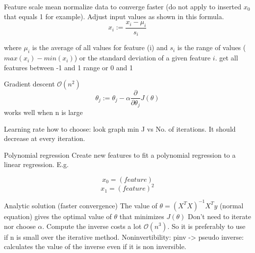 \documentclass[12pt,a4paper]{report}
\begin{document}
Feature scale
	mean normalize data to converge faster (do not apply to inserted $ x_{0} $ that equals 1 for example). Adjust input values as shown in this formula.
	\begin{equation}
	x_{i} := \frac{x_{i}-\mu_{i}}{s_{i}}
	\end{equation}
	
	where $ \mu_{i} $ is the average of all values for feature (i) and $ s_{i} $ is the range of values ($ max(x_{i})-min(x_{i}) $) or the standard deviation of a given feature $ i $.
	get all features between -1 and 1 range or 0 and 1
	
Gradient descent $\mathcal{O}(n^{2})$
	\begin{equation}
	\theta_{j} := \theta_{j} - \alpha \frac{\partial}{\partial \theta_{j}}J(\theta)
	\end{equation}
	works well when n is large
	
Learning rate
	how to choose: look graph min J vs No. of iterations. It should decrease at every iteration.

Polynomial regression
	Create new features to fit a polynomial regression to a linear regression.
	E.g.
	
	\begin{equation}
	x_{0} = (feature)
	\end{equation}
	\begin{equation}
	x_{1} = (feature)^{2}
	\end{equation}
	
	
Analytic solution (faster convergence)
	The value of $ \theta = (X^{T}X)^{-1}X^{T}y $ (normal equation) gives the optimal value of $\theta$ that minimizes $ J(\theta) $
	Don't need to iterate nor choose $\alpha$.
	Compute the inverse costs a lot $\mathcal{O}(n^{3})$. So it is preferably to use if n is small over the iterative method.
	Noninvertibility: pinv -> pseudo inverse: calculates the value of the inverse even if it is non inversible. 
	
\end{document}
